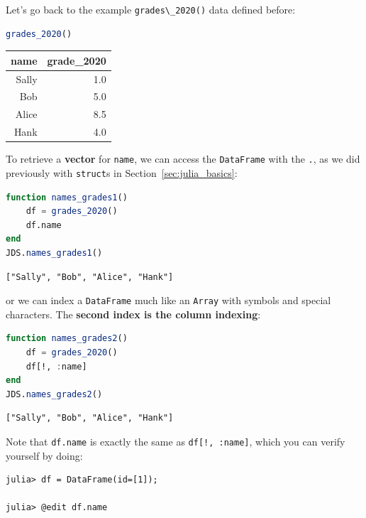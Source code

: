 \documentclass[
  notoc %
]{tufte-book}
\newcommand{\passthrough}[1]{#1}
\begin{document}
Let's go back to the example \passthrough{\lstinline!grades\_2020()!}
data defined before:

\begin{lstlisting}[language=Julia]
grades_2020()
\end{lstlisting}

\begin{longtable}[]{@{}rr@{}}
\toprule()
name & grade\_2020 \\
\midrule()
\endhead
Sally & 1.0 \\
Bob & 5.0 \\
Alice & 8.5 \\
Hank & 4.0 \\
\bottomrule()
\end{longtable}

To retrieve a \textbf{vector} for \passthrough{\lstinline!name!}, we can
access the \passthrough{\lstinline!DataFrame!} with the
\passthrough{\lstinline!.!}, as we did previously with
\passthrough{\lstinline!struct!}s in Section~\ref{sec:julia_basics}:

\begin{lstlisting}[language=Julia]
function names_grades1()
    df = grades_2020()
    df.name
end
JDS.names_grades1()
\end{lstlisting}

\begin{lstlisting}[language=Output]
["Sally", "Bob", "Alice", "Hank"]
\end{lstlisting}

or we can index a \passthrough{\lstinline!DataFrame!} much like an
\passthrough{\lstinline!Array!} with symbols and special characters. The
\textbf{second index is the column indexing}:

\begin{lstlisting}[language=Julia]
function names_grades2()
    df = grades_2020()
    df[!, :name]
end
JDS.names_grades2()
\end{lstlisting}

\begin{lstlisting}[language=Output]
["Sally", "Bob", "Alice", "Hank"]
\end{lstlisting}

Note that \passthrough{\lstinline!df.name!} is exactly the same as
\passthrough{\lstinline"df[!, :name]"}, which you can verify yourself by
doing:

\begin{lstlisting}
julia> df = DataFrame(id=[1]);

julia> @edit df.name
\end{lstlisting}
\end{document}
